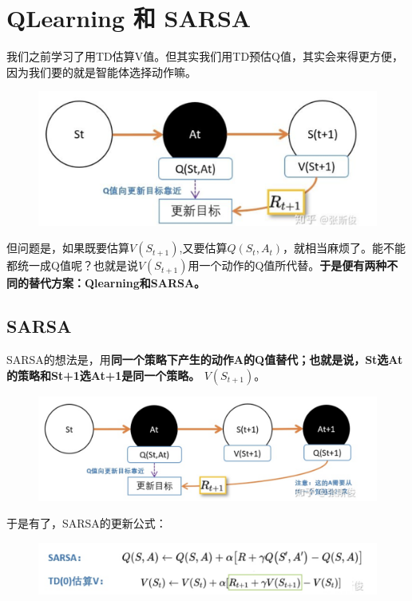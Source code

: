 \documentclass[12pt]{article}
\begin{document}
\section{QLearning 和 SARSA}
我们之前学习了用TD估算V值。但其实我们用TD预估Q值，其实会来得更方便，因为我们要的就是智能体选择动作嘛。
\begin{figure}[H]
    \centering
    \includegraphics[width=.8\textwidth]{fig/ReinforcementLearning/RL_TD_For_Q.png}
\end{figure}

但问题是，如果既要估算$V(S_{t+1})$,又要估算$Q(S_t,A_t)$，就相当麻烦了。能不能都统一成Q值呢？也就是说$V(S_{t+1})$用一个动作的Q值所代替。\textbf{于是便有两种不同的替代方案：Qlearning和SARSA。}

\subsection{SARSA}
SARSA的想法是，用\textbf{同一个策略下产生的动作A的Q值替代；也就是说，St选At的策略和St+1选At+1是同一个策略。
$V(S_{t+1})$}。
\begin{figure}[H]
    \centering
    \includegraphics[width=.8\textwidth]{fig/ReinforcementLearning/RL_SARSA_Update_V.png}
\end{figure}

于是有了，SARSA的更新公式：
\begin{figure}[H]
    \centering
    \includegraphics[width=.8\textwidth]{fig/ReinforcementLearning/RL_SARSA_Update_V_Eq.png}
\end{figure}
\end{document}

